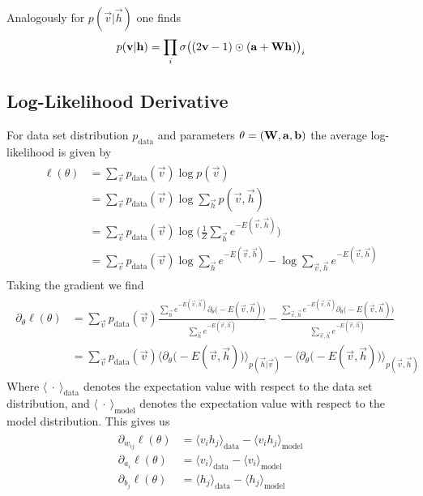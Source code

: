 Analogously for \( p(\vec{v} | \vec{h}) \) one finds
\begin{align}
    p(\mathbf{v} | \mathbf{h}) = \prod_i \sigma\big( (2\mathbf{v} - 1) \odot (\mathbf{a} + \mathbf{W}\mathbf{h}) \big)_i
\end{align}

\subsection{Log-Likelihood Derivative}\label{app:rbm_log_likelihood_derivation}
For data set distribution \( p_\text{data} \) and parameters \( \theta = (\mathbf{W}, \mathbf{a}, \mathbf{b}) \) the average log-likelihood is given by
\begin{align}
\begin{split}
    \ell(\theta)
        &= \sum_{\vec{v}} p_{\text{data}}(\vec{v}) \log p(\vec{v}) \\
        &= \sum_{\vec{v}} p_{\text{data}}(\vec{v}) \log \sum_\vec{h} p(\vec{v},\vec{h}) \\
        &= \sum_{\vec{v}} p_{\text{data}}(\vec{v}) \log \bigg(\frac{1}{Z} \sum_\vec{h} e^{-E(\vec{v},\vec{h})}\bigg) \\
        &= \sum_{\vec{v}} p_{\text{data}}(\vec{v}) \log \sum_\vec{h} e^{-E(\vec{v},\vec{h})} - \log \sum_{\vec{v},\vec{h}} e^{-E(\vec{v},\vec{h})}
\end{split}
\end{align}
Taking the gradient we find
\begin{align}
\begin{split}
    \partial_{\theta} \ell(\theta)
        &= \sum_{\vec{v}} p_{\text{data}}(\vec{v}) \frac{\sum_\vec{h} e^{-E(\vec{v},\vec{h})} \partial_{\theta}\big( -E(\vec{v},\vec{h}) \big) }{\sum_\vec{h} e^{-E(\vec{v},\vec{h})}}
            - \frac{\sum_{\vec{v},\vec{h}} e^{-E(\vec{v},\vec{h})} \partial_{\theta}\big( -E(\vec{v},\vec{h}) \big) }{\sum_{\vec{v},\vec{h}} e^{-E(\vec{v},\vec{h})}} \\
        &= \sum_{\vec{v}} p_{\text{data}}(\vec{v}) \Big\langle \partial_{\theta}\big( -E(\vec{v},\vec{h}) \big) \Big\rangle_{p(\vec{h}|\vec{v})}
        - \Big\langle \partial_{\theta}\big( -E(\vec{v},\vec{h}) \big) \Big\rangle_{p(\vec{v},\vec{h})}
\end{split}
\end{align}
Where \( \langle \ \cdot \ \rangle_{\text{data}} \) denotes the expectation value with respect to the data set distribution, and \( \langle \ \cdot \ \rangle_{\text{model}} \) denotes the expectation value with respect to the model distribution.
This gives us
\begin{align}
\begin{split}
    \partial_{w_{ij}} \ell(\theta)
        &= \langle v_i h_j \rangle_{\text{data}} - \langle v_i h_j \rangle_{\text{model}} \\
    \partial_{a_i} \ell(\theta)
        &= \langle v_i \rangle_{\text{data}} - \langle v_i \rangle_{\text{model}} \\
    \partial_{b_j} \ell(\theta)
        &= \langle h_j \rangle_{\text{data}} - \langle h_j \rangle_{\text{model}}
\end{split}
\end{align}

